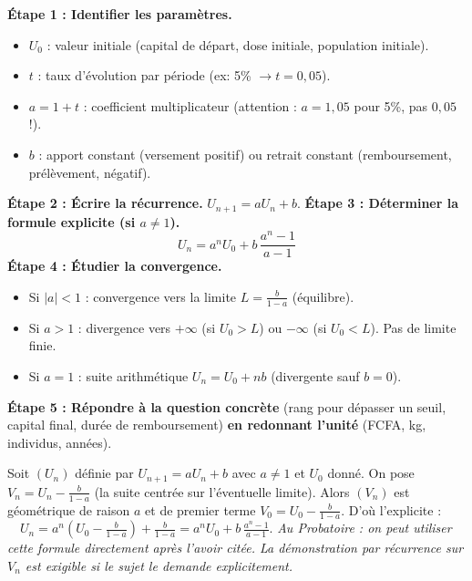 \documentclass[11pt]{article}
\begin{document}
\begin{methode}
\textbf{Étape 1 : Identifier les paramètres.}
\begin{itemize}
    \item $U_0$ : valeur initiale (capital de départ, dose initiale, population initiale).
    \item $t$ : taux d'évolution par période (ex: 5\% $\rightarrow t=0,05$).
    \item $a = 1+t$ : coefficient multiplicateur (attention : $a=1{,}05$ pour 5\%, pas $0,05$ !).
    \item $b$ : apport constant (versement positif) ou retrait constant (remboursement, prélèvement, négatif).
\end{itemize}
\textbf{Étape 2 : Écrire la récurrence.} $U_{n+1} = a U_n + b$.
\textbf{Étape 3 : Déterminer la formule explicite (si $a \neq 1$).}
\[ U_n = a^n U_0 + b\,\frac{a^n - 1}{a - 1} \]
\textbf{Étape 4 : Étudier la convergence.}
\begin{itemize}
    \item Si $|a| < 1$ : convergence vers la limite $L = \frac{b}{1-a}$ (équilibre).
    \item Si $a > 1$ : divergence vers $+\infty$ (si $U_0 > L$) ou $-\infty$ (si $U_0 < L$). Pas de limite finie.
    \item Si $a = 1$ : suite arithmétique $U_n = U_0 + nb$ (divergente sauf $b=0$).
\end{itemize}
\textbf{Étape 5 : Répondre à la question concrète} (rang pour dépasser un seuil, capital final, durée de remboursement) \textbf{en redonnant l'unité} (FCFA, kg, individus, années).
\end{methode}

\begin{propriete}
Soit $(U_n)$ définie par $U_{n+1} = a U_n + b$ avec $a \neq 1$ et $U_0$ donné.
On pose $V_n = U_n - \frac{b}{1-a}$ (la suite centrée sur l'éventuelle limite).
Alors $(V_n)$ est géométrique de raison $a$ et de premier terme $V_0 = U_0 - \frac{b}{1-a}$.
D'où l'explicite : $\quad U_n = a^n \left(U_0 - \frac{b}{1-a}\right) + \frac{b}{1-a} = a^n U_0 + b\,\frac{a^n - 1}{a - 1}$.
\emph{Au Probatoire : on peut utiliser cette formule directement après l'avoir citée. La démonstration par récurrence sur $V_n$ est exigible si le sujet le demande explicitement.}
\end{propriete}
\end{document}
